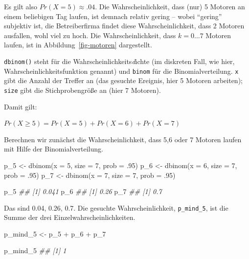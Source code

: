 \documentclass[
  ngerman,
  letterpaper,
  twoside,
  open=any]{scrbook}
\newenvironment{Shaded}{\begin{snugshade}}{\end{snugshade}}
\newcommand{\AttributeTok}[1]{\textcolor[rgb]{0.40,0.45,0.13}{#1}}
\newcommand{\DecValTok}[1]{\textcolor[rgb]{0.68,0.00,0.00}{#1}}
\newcommand{\DocumentationTok}[1]{\textcolor[rgb]{0.37,0.37,0.37}{\textit{#1}}}
\newcommand{\FunctionTok}[1]{\textcolor[rgb]{0.28,0.35,0.67}{#1}}
\newcommand{\NormalTok}[1]{\textcolor[rgb]{0.00,0.23,0.31}{#1}}
\newcommand{\OtherTok}[1]{\textcolor[rgb]{0.00,0.23,0.31}{#1}}
\newcommand{\SpecialCharTok}[1]{\textcolor[rgb]{0.37,0.37,0.37}{#1}}
\theoremstyle{definition}
\theoremstyle{plain}
\theoremstyle{definition}
\theoremstyle{definition}
\theoremstyle{definition}
\theoremstyle{definition}
\theoremstyle{remark}
\begin{document}
Es gilt also \(Pr(X=5) \approx .04\). Die Wahrscheinlichkeit, dass (nur)
5 Motoren an einem beliebigen Tag laufen, ist demnach relativ gering --
wobei \enquote{gering} subjektiv ist, die Betreiberfirma findet diese
Wahrscheinlichkeit, dass 2 Motoren ausfallen, wohl viel zu hoch. Die
Wahrscheinlichkeit, dass \(k=0 \ldots 7\) Motoren laufen, ist in
Abbildung~\ref{fig-motoren} dargestellt.

\texttt{dbinom()} steht für die Wahrscheinlichkeits\emph{d}ichte (im
diskreten Fall, wie hier, Wahrscheinlichkeitsfunktion genannt) und
\texttt{binom} für die Binomialverteilung. \texttt{x} gibt die Anzahl
der Treffer an (das gesuchte Ereignis, hier 5 Motoren arbeiten);
\texttt{size} gibt die Stichprobengröße an (hier 7 Motoren).

Damit gilt:

\(Pr(X\ge 5) = Pr(X=5) + Pr(X=6) + Pr(X=7)\)

Berechnen wir zunächst die Wahrscheinlichkeit, dass 5,6 oder 7 Motoren
laufen mit Hilfe der Binomialverteilung.

\begin{Shaded}
\begin{Highlighting}[]
\NormalTok{p\_5 }\OtherTok{\textless{}{-}} \FunctionTok{dbinom}\NormalTok{(}\AttributeTok{x =} \DecValTok{5}\NormalTok{, }\AttributeTok{size =} \DecValTok{7}\NormalTok{, }\AttributeTok{prob =}\NormalTok{ .}\DecValTok{95}\NormalTok{)}
\NormalTok{p\_6 }\OtherTok{\textless{}{-}} \FunctionTok{dbinom}\NormalTok{(}\AttributeTok{x =} \DecValTok{6}\NormalTok{, }\AttributeTok{size =} \DecValTok{7}\NormalTok{, }\AttributeTok{prob =}\NormalTok{ .}\DecValTok{95}\NormalTok{)}
\NormalTok{p\_7 }\OtherTok{\textless{}{-}} \FunctionTok{dbinom}\NormalTok{(}\AttributeTok{x =} \DecValTok{7}\NormalTok{, }\AttributeTok{size =} \DecValTok{7}\NormalTok{, }\AttributeTok{prob =}\NormalTok{ .}\DecValTok{95}\NormalTok{)}

\NormalTok{p\_5}
\DocumentationTok{\#\# [1] 0.041}
\NormalTok{p\_6}
\DocumentationTok{\#\# [1] 0.26}
\NormalTok{p\_7}
\DocumentationTok{\#\# [1] 0.7}
\end{Highlighting}
\end{Shaded}

Das sind 0.04, 0.26, 0.7. Die gesuchte Wahrscheinlichkeit,
\texttt{p\_mind\_5}, ist die Summe der drei Einzelwahrscheinlichkeiten.

\begin{Shaded}
\begin{Highlighting}[]
\NormalTok{p\_mind\_5 }\OtherTok{\textless{}{-}}\NormalTok{ p\_5 }\SpecialCharTok{+}\NormalTok{ p\_6 }\SpecialCharTok{+}\NormalTok{ p\_7}

\NormalTok{p\_mind\_5}
\DocumentationTok{\#\# [1] 1}
\end{Highlighting}
\end{Shaded}
\end{document}
